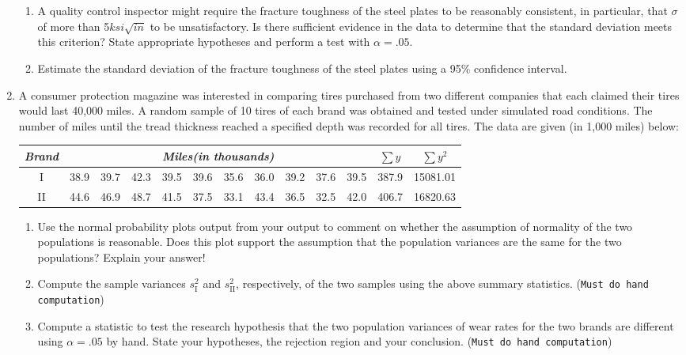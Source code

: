 \documentclass[11pt]{article}
\begin{document}
\begin{enumerate}
\begin{enumerate}
\item A quality control inspector might require the fracture toughness of the steel plates  
to be reasonably consistent, in particular, that $\sigma$ of more than 5$ksi\sqrt{in}$ to be unsatisfactory. Is there sufficient evidence in the data to determine that the standard deviation meets this criterion? State appropriate hypotheses and perform a test with $\alpha=.05$.\\[2in]

\item Estimate the standard deviation of the  fracture toughness of the steel plates 
 using a 95\% confidence interval.\\[2in]
\end{enumerate}
\newpage
\item A consumer protection magazine was interested in comparing tires
purchased from two different companies that each claimed their tires
would last 40,000 miles. A random sample of 10 tires of each brand
was obtained and tested under simulated road conditions. The number
of miles until the tread thickness reached a specified depth was
recorded for all tires. The data are given (in 1,000 miles) below:
\begin{center}
\begin{tabular}{c|rrrrrrrrrr|rr}
\hline 
 \multicolumn{1}{c|}{\textit{Brand}} & \multicolumn{10}{c|}{\textit{Miles(in thousands)}} & 
     \multicolumn{1}{c}{$\sum{y}$} &
     \multicolumn{1}{c}{$\sum{y^2}$}  \\ \hline
I  &38.9 &39.7 &42.3 &39.5 &39.6 &35.6 &36.0 &39.2 &37.6 &39.5 & 387.9 & 15081.01\\
II &44.6 &46.9 &48.7 &41.5 &37.5 &33.1 &43.4 &36.5 &32.5 &42.0 & 406.7 & 16820.63 \\ \hline
\end{tabular}
\end{center}
\begin{enumerate}
\item Use the normal probability plots output from your output
to comment on whether the assumption of normality of the two populations
is reasonable. Does this plot support the assumption that
the population variances are the same for the two populations? 
Explain your answer!\\[2in]
\item Compute the sample variances $s_{\mbox{I}}^2$ and $s_{\mbox{II}}^2$, respectively, of 
the two samples using the above summary statistics. (\texttt{Must do hand computation})\\[2in]
\item Compute a statistic to test the research hypothesis that the two 
population variances of wear rates for the two brands are different using 
$\alpha=.05$ by hand. State your hypotheses, the rejection region and 
your conclusion. (\texttt{Must do hand computation})\\[1.7in]
\end{enumerate}
\end{enumerate}
\end{document}
